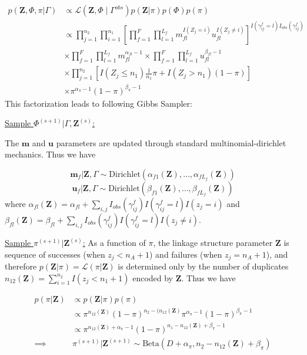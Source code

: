 \documentclass[12pt,letterpaper]{article}
\newcommand{\1}[1]{\mathbb{I}\!\left[#1\right]} %
\begin{document}
\begin{align*}
	p(\bm{Z}, \Phi, \pi|\Gamma) &\propto \mathcal{L}(\bm{Z}, \Phi \mid \Gamma^{obs}) p(\bm{Z} | \pi) p(\Phi) p(\pi) \\
	&\propto \prod_{j=1}^{n_2}  \prod_{i=1}^{n_1}\left[ \prod_{f=1}^{F}\prod_{l=1}^{L_f} m_{fl}^{I(Z_j = i)}u_{fl}^{I(Z_j \neq i)}\right]^{I(\gamma_{ij}^f = l)I_{obs}(\gamma_{ij}^f)} \\
	&\times  \prod_{f=1}^{F}\prod_{l=1}^{L_f} m_{fl}^{\alpha_{fl} - 1}  \times\prod_{f=1}^{F}\prod_{l=1}^{L_f} u_{fl}^{\beta_{fl} - 1} \\
	&\times \prod_{j=1}^{n_2} \left[I(Z_j \leq n_1)\frac{1}{n_1}\pi + I(Z_j > n_1)(1 - \pi)\right] \\
	&\times \pi^{\alpha_{\pi} -1} (1-\pi)^{\beta_{\pi} -1}
\end{align*}
This factorization leads to following Gibbs Sampler:

\underline{Sample $\Phi^{(s+1)}|\Gamma, \bm{Z}^{(s)}$:}

The $\bm{m}$ and $\bm{u}$ parameters are updated through standard multinomial-dirichlet mechanics. Thus we have

$$\bm{m}_f|\bm{Z}, \Gamma \sim \text{Dirichlet}(\alpha_{f1}(\bm{Z}), \ldots, \alpha_{fL_f}(\bm{Z}))$$
$$\bm{u}_f|\bm{Z}, \Gamma \sim \text{Dirichlet}(\beta_{f1}(\bm{Z}), \ldots, \beta_{fL_f}(\bm{Z}))$$
where
\(\alpha_{fl}(\bm{Z})= \alpha_{fl} + \sum_{i,j} I_{obs}(\gamma_{ij}^f)I(\gamma_{ij}^f = l) I(z_j = i)\)
and
\(\beta_{fl}(\bm{Z})= \beta_{fl} + \sum_{i,j} I_{obs}(\gamma_{ij}^f)I(\gamma_{ij}^f = l) I(z_j \neq i)\).

\underline{Sample $\pi^{(s+1)}|\bm{Z}^{(s)}$:} As a function of
\(\pi\), the linkage structure parameter \(\bm{Z}\) is sequence
of successes (when \(z_j < n_A + 1\)) and failures (when
\(z_j = n_A + 1\)), and therefore
\(p(\bm{Z}|\pi) = \mathcal{L}(\pi|\bm{Z})\) is
determined only by the number of duplicates
$n_{12}(\bm{Z}) = \sum_{i=1}^{n_2}I(z_j < n_1 + 1)$ encoded by
$\bm{Z}$. Thus we have

\begin{align*}
p(\pi | \bm{Z}) &\propto p(\bm{Z}|\pi)p(\pi) \\
&\propto \pi^{n_{12}(\bm{Z})} (1-\pi)^{n_2 - (n_{12}(\bm{Z})} \pi^{\alpha_{\pi} -1} (1-\pi)^{\beta_{\pi} -1} \\
&\propto \pi^{n_{12}(\bm{Z}) + \alpha_{\pi} - 1} (1-\pi)^{n_1 - n_{12}(\bm{Z}) + \beta_{\pi} -1} \\
\implies &\pi^{(s+1)}|\bm{Z}^{(s+1)} \sim \text{Beta}(D + \alpha_{\pi}, n_2 - n_{12}(\bm{Z}) + \beta_{\pi})
\end{align*}
\end{document}
